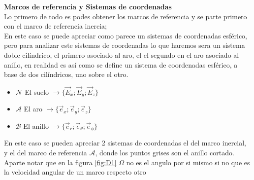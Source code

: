 \ifmostrarSolucion
\begin{tcolorbox}[title=Anillo rotador,breakable]
\textbf{Marcos de referencia y Sistemas de coordenadas}\\

Lo primero de todo es podes obtener los marcos de referencia y se parte primero con el marco de referencia inercia;\\
En este caso se puede apreciar como parece un sistemas de coordenadas esférico, pero para analizar este sistemas de coordenadas lo que haremos sera un sistema doble cilíndrico, el primero asociado al aro, el el segundo en el aro asociado al anillo, en realidad es así como se define un sistema de coordenadas esférico, a base de dos cilíndricos, uno sobre el otro.
\begin{itemize}
    \item $\mathcal{N}$ El suelo $\longrightarrow\{\vec{E}_x;\vec{E}_y;\vec{E}_z\}$
    \item $\mathcal{A}$ El aro $\longrightarrow\{\vec{e}_x;\vec{e}_y;\vec{e}_z\}$
    \item $\mathcal{B}$ El anillo $\longrightarrow\{\vec{e}_r;\vec{e}_\theta;\vec{e}_\phi\}$
\end{itemize}

En este caso se pueden apreciar 2 sistemas de coordenadas el del marco inercial, y el del marco de referencia $\mathcal{A}$, donde los puntos grises son el anillo cortado. Aparte notar que en la figura \ref{fig:D1} $\Omega$ no es el angulo por si mismo si no que es la velocidad angular de un marco respecto otro


\begin{center}
    \begin{minipage}{0.48\textwidth}
        \centering
\end{minipage}
\end{center}
\end{tcolorbox}
